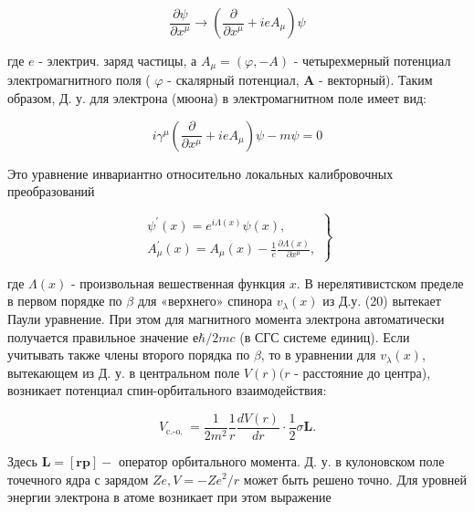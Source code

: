 \documentclass[10pt]{article}
\begin{document}
\[

\frac{\partial \psi}{\partial x^{\mu}} \rightarrow\left(\frac{\partial}{\partial x^{\mu}}+i e A_{\mu}\right) \psi

\]



где $e$ - электрич. заряд частицы, а $A_{\mu}=(\varphi,-A)$ - четырехмерный потенциал электромагнитного поля ( $\varphi$ - скалярный потенциал, $\boldsymbol{A}$ - векторный). Таким образом, Д. у. для электрона (мюона) в электромагнитном поле имеет вид:



\[

i \gamma^{\mu}\left(\frac{\partial}{\partial x^{\mu}}+i e A_{\mu}\right) \psi-m \psi=0

\]



Это уравнение инвариантно относительно локальных калибровочных преобразований



\[

\left.\begin{array}{l}

\psi^{\prime}(x)=e^{i \Lambda(x)} \psi(x), \\

A_{\mu}^{\prime}(x)=A_{\mu}(x)-\frac{1}{e} \frac{\partial \Lambda(x)}{\partial x^{\mu}},

\end{array}\right\}

\]



где $\Lambda(x)$ - произвольная вешественная функция $x$. В нерелятивистском пределе в первом порядке по $\beta$ для «верхнего» спинора $v_{\lambda}(x)$ из Д.у. (20) вытекает Паули уравнение. При этом для магнитного момента электрона автоматически получается правильное значение $е \hbar / 2 m c$ (в СГС системе единиц). Если учитывать также члены второго порядка по $\beta$, то в уравнении для $v_{\lambda}(x)$, вытекающем из Д. у. в центральном поле $V(r)(r$ - расстояние до центра), возникает потенциал спин-орбитального взаимодействия:



\[

V_{\text {c.-o. }}=\frac{1}{2 m^{2}} \frac{1}{r} \frac{d V(r)}{d r} \cdot \frac{1}{2} \sigma \boldsymbol{L} .

\]



Здесь $\boldsymbol{L}=[\boldsymbol{r p}]-$ оператор орбитального момента. Д. у. в кулоновском поле точечного ядра с зарядом $Z e, V=-Z e^{2} / r$ может быть решено точно. Для уровней энергии электрона в атоме возникает при этом выражение
\end{document}
